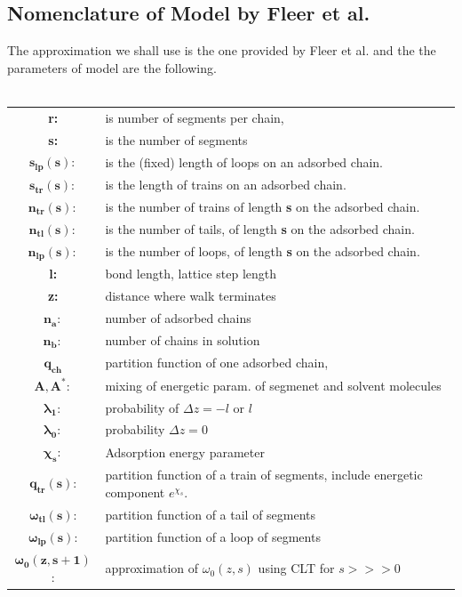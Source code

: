 \documentclass[10pt,letterpaper]{article}
\begin{document}
\subsection{Nomenclature of Model by Fleer et al.}
The approximation we shall use is the one provided by Fleer et al.\cite{fleer1993polymers} and the the parameters of model are the following.\\\\
%
\begin{tabular}{c|l}
\hline
\textbf{r:} & is number of segments per chain,\\
\textbf{s:} & is the number of segments \\ 
$\mathbf{s_{lp}(s):}$ &is the (fixed) length of loops on an adsorbed chain.\\
$\mathbf{s_{tr}(s):}$ &is the length of trains on an adsorbed chain.\\
$\mathbf{n_{tr}(s):}$ & is the number of trains of length \textbf{s}  on the adsorbed chain.\\
$\mathbf{n_{tl}(s):}$ &is the number of tails, of length \textbf{s}  on the adsorbed chain.\\
$\mathbf{n_{lp}(s):}$ &is the number of loops, of length \textbf{s}  on the adsorbed chain.\\
\textbf{l:}&bond length, lattice step length\\
\textbf{z:}&distance where walk terminates\\
$\mathbf{n_a:}$ &number of adsorbed chains\\
$\mathbf{n_b:}$&number of chains in solution\\
$\mathbf{q_{ch}}$&partition function of one adsorbed chain,\\
$\mathbf{A,A^{*}:}$& mixing of energetic param. of segmenet and solvent molecules\footnotemark \\
$\mathbf{\lambda_1:}$&probability of $\Delta z=-l$ or $l$\\
$\mathbf{\lambda_0:}$ &probability $\Delta z=0$\\
$\mathbf{\chi_{s}:}$ &Adsorption energy parameter\\
$\mathbf{q_{tr}(s)}$: & partition function of a train of segments, include energetic component $e^{\chi_s}$.\\
$\mathbf{\omega_{tl}(s)}$:&partition function of a tail of segments\\
$\mathbf{\omega_{lp}(s)}$:&partition function of a loop of segments\\
$\mathbf{\omega_0(z,s+1)}$:&approximation of $\omega_0(z,s)$ using CLT for $s>>>0$ \\

\end{tabular}
\end{document}
